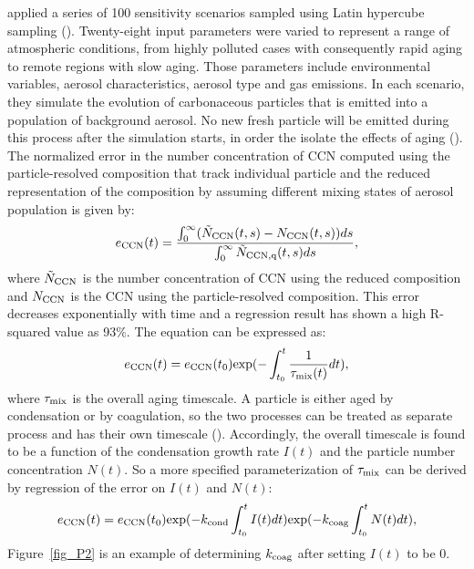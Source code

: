 \documentclass[12pt, fullpage]{uiucthesis2009}
\begin{document}
	\cite{Fierce2016} applied a series of 100 sensitivity scenarios sampled using Latin hypercube sampling (\cite{mckay1979comparison}). Twenty-eight input parameters were varied to represent a range of atmospheric conditions, from highly polluted cases with consequently rapid aging to remote regions with slow aging. Those parameters include environmental variables, aerosol characteristics, aerosol type and gas emissions. In each scenario, they simulate the evolution of carbonaceous particles that is emitted into a population of background aerosol. No new fresh particle will be emitted during this process after the simulation starts, in order the isolate the effects of aging (\cite{Fierce2016}). The normalized error in the number concentration of CCN computed using the particle-resolved composition that track individual particle and the reduced representation of the composition by assuming different mixing states of aerosol population is given by:
	\begin{align}\label{eq:11}
	e_{\rm CCN}(t) = \frac{\int_{0}^{\infty}( \tilde{N}_{\rm CCN}(t,s) - 
		N_{\rm CCN} (t,s))ds}{\int_{0}^{\infty} \tilde{N}_{\rm CCN, q}(t,s)ds},
	\end{align}
	where $\tilde{N}_{\rm CCN}$ is the number concentration of CCN using the reduced composition and $N_{\rm CCN}$ is the CCN using the particle-resolved composition. This error decreases exponentially with time and a regression result has shown a high R-squared value as 93$\%$. The equation can be expressed as:
	\begin{align}
	e_{\rm CCN}(t) = e_{\rm CCN}(t_{0})\text{exp}(-\int_{t_{0}}^{t}\frac{1}{\tau_{\rm mix}(t)} dt), 
	\end{align}
	where $\tau_{\rm mix}$ is the overall aging timescale. 
	A particle is either aged by condensation or by coagulation, so the two processes can be treated as separate process and has their own timescale (\cite{Fierce2015}). Accordingly, the overall timescale is found to be a function of the condensation growth rate $I(t)$ and the particle number concentration $N(t)$.
	So a more specified parameterization of $\tau_{\rm mix}$ can be derived by regression of the error on $I(t)$ and $N(t)$:
	\begin{align}
	e_{\rm CCN}(t) = e_{\rm CCN}(t_{0})\text{exp}(-k_{\rm cond}\int_{t_{0}}^{t} I(t) dt)\text{exp}(-k_{\rm coag}\int_{t_{0}}^{t}N(t) dt), 
	\end{align}
	Figure~\ref{fig_P2} is an example of determining $k_{\rm coag}$ after setting $I(t)$ to be 0. 
	
\end{document}

